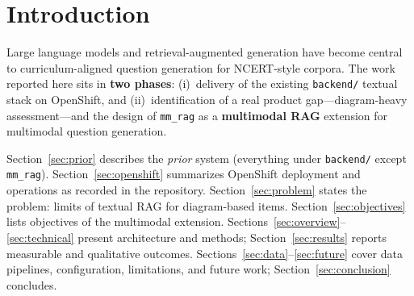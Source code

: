 \documentclass[11pt]{article}
\begin{document}
\begin{abstract}
\noindent
\textbf{Context.} The BharatGen Yojaka question-generation platform already included a \emph{textual} NCERT retrieval stack under \texttt{backend/} (outside \texttt{mm\_rag}): FastAPI services, dense text embeddings with FAISS, ingestion in \texttt{ncert\_rag\_pipe/}, and optional remote reranking. That system was taken through \textbf{OpenShift} deployment (project \texttt{nextgen}, deployment \texttt{bharatgen-yojaka-qg-platform}, routes and secrets as documented in \texttt{backend/deployment.md} and \texttt{backend/deploy\_app.yaml}).

\textbf{Gap.} After deployment, usage made clear that \textbf{text-only RAG cannot faithfully support diagram-based questions}: labeling anatomical drawings, interpreting circuit or ray diagrams, and similar items require retrieved \emph{images} and vision-capable generation, not paragraphs alone.

\textbf{Contribution.} This report documents the follow-on \texttt{mm\_rag} module: multimodal retrieval and question generation by indexing \textbf{text chunks and figure records} in a shared SigLIP space, FAISS search with balanced text--figure quotas, and a Flask service using split text/vision Groq calls. We tie this extension to the prior stack, the OpenShift rollout, and the closing \emph{defense} narrative (slide template PDF at repository root). We also summarize ingestion, API surface, configuration, batch-index limitations, and future work.
\end{abstract}

\newpage
\tableofcontents
\newpage

\section{Introduction}

Large language models and retrieval-augmented generation have become central to curriculum-aligned question generation for NCERT-style corpora. The work reported here sits in \textbf{two phases}: (i)~delivery of the existing \texttt{backend/} textual stack on OpenShift, and (ii)~identification of a real product gap---diagram-heavy assessment---and the design of \texttt{mm\_rag} as a \textbf{multimodal RAG} extension for multimodal question generation.

\par
Section~\ref{sec:prior} describes the \emph{prior} system (everything under \texttt{backend/} except \texttt{mm\_rag}). Section~\ref{sec:openshift} summarizes OpenShift deployment and operations as recorded in the repository. Section~\ref{sec:problem} states the problem: limits of textual RAG for diagram-based items. Section~\ref{sec:objectives} lists objectives of the multimodal extension. Sections~\ref{sec:overview}--\ref{sec:technical} present architecture and methods; Section~\ref{sec:results} reports measurable and qualitative outcomes. Sections~\ref{sec:data}--\ref{sec:future} cover data pipelines, configuration, limitations, and future work; Section~\ref{sec:conclusion} concludes.
\end{document}

